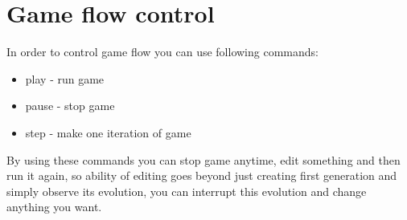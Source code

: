 \chapter*{Game flow control}

In order to control game flow you can use following commands:

\begin{itemize}
	\item \textsf{play} - run game
	\item \textsf{pause} - stop game
	\item \textsf{step} - make one iteration of game
\end{itemize}

By using these commands you can stop game anytime, edit something and then run it again, so ability of editing goes beyond just creating first generation and simply observe its evolution, you can interrupt this evolution and change anything you want.
